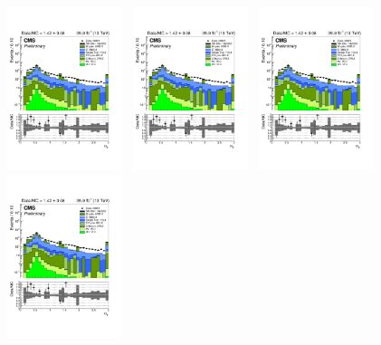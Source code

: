 \clearpage
\begin{figure}[h!]
  \begin{center}
    \includegraphics[width=0.3\textwidth,page=18,trim=0 100 50 100,clip]{figures/SITV/Event/Event.pdf}~
    \includegraphics[width=0.3\textwidth,page=17,trim=0 100 50 100,clip]{figures/SITV/Event/Event.pdf}~
    \includegraphics[width=0.3\textwidth,page=13,trim=0 100 50 100,clip]{figures/SITV/Event/Event.pdf}\\
    \includegraphics[width=0.3\textwidth,page=3,trim=0 100 50 100,clip]{figures/SITV/Event/Event.pdf}~

\end{center}
\end{figure}
